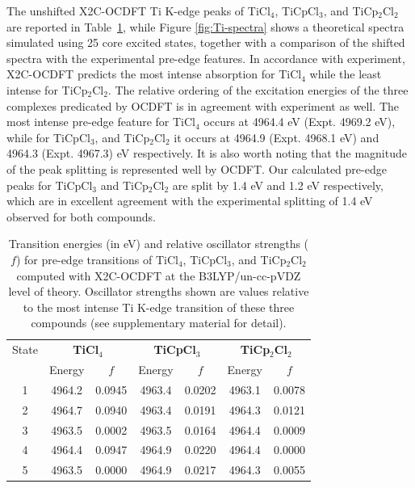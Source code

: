 \documentclass{article}
\begin{document}
The unshifted X2C-OCDFT Ti K-edge peaks of TiCl$_4$, TiCpCl$_3$, and TiCp$_2$Cl$_2$ are reported in Table~\ref{table:pre-edge}, while Figure \ref{fig:Ti-spectra} shows a theoretical spectra simulated using 25 core excited states, together with a comparison of the shifted spectra with the experimental pre-edge features.\cite{TiCl4}
In accordance with experiment\cite{TiCl4}, X2C-OCDFT predicts the most intense absorption for TiCl$_4$ while the least intense for TiCp$_2$Cl$_2$. The relative ordering of the excitation energies of the three complexes predicated by OCDFT is in agreement with experiment as well. The most intense pre-edge feature for TiCl$_4$ occurs at 4964.4 eV (Expt. 4969.2 eV), while for TiCpCl$_3$, and TiCp$_2$Cl$_2$ it occurs at 4964.9 (Expt. 4968.1 eV) and 4964.3 (Expt. 4967.3) eV respectively.
It is also worth noting that the magnitude of the peak splitting is represented well by OCDFT. Our calculated pre-edge peaks for TiCpCl$_3$ and TiCp$_2$Cl$_2$ are split by 1.4 eV and 1.2 eV respectively, which are in excellent agreement with the experimental splitting of 1.4 eV observed for both compounds.

 \begin{table}[!b]
\caption{Transition energies (in eV) and relative oscillator strengths ($f$) for pre-edge transitions of TiCl$_4$, TiCpCl$_3$, and TiCp$_2$Cl$_2$ computed with X2C-OCDFT at the B3LYP/un-cc-pVDZ level of theory. Oscillator strengths shown are values relative to the most intense Ti K-edge transition of these three compounds (see supplementary material for detail).}
\begin{tabular}{ccccccc}
\toprule
State &   \multicolumn{2}{c}{\textbf{TiCl$_4$}}   & \multicolumn{2}{c}{\textbf{TiCpCl$_3$}} & \multicolumn{2}{c}{\textbf{TiCp$_2$Cl$_2$}} \\
& Energy & $f$ & Energy  & $f$ & Energy  & $f$ \\
     \cmidrule(r){2-3} \cmidrule(lr){4-5} \cmidrule(lr){6-7}  
1     &   4964.2 &             0.0945   & 4963.4 &    0.0202   & 4963.1 &                              0.0078 \\
2     &   4964.7 &             0.0940   & 4963.4 &    0.0191   &  4964.3 &                              0.0121 \\
3     &   4963.5 &             0.0002   & 4963.5 &    0.0164   & 4964.4 &                              0.0009 \\
4     &  4964.4  &             0.0947   &  4964.9 &   0.0220  & 4964.4 &                              0.0000 \\
5      & 4963.5         &      0.0000    & 4964.9 &   0.0217   & 4964.3 &                              0.0055 \\
\bottomrule
 	\end{tabular}
 	\label{table:pre-edge}
 \end{table}
\end{document}
